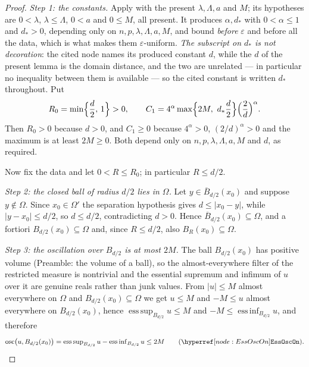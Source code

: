 \begin{proof}
\emph{Step 1: the constants.}  Apply 
with the present $\lambda,\Lambda,a$ and $M$; its hypotheses are $0<\lambda$,
$\lambda\le\Lambda$, $0<a$ and $0\le M$, all present.  It produces
$\alpha,d_\ast$ with $0<\alpha\le1$ and $d_\ast>0$, depending only on
$n,p,\lambda,\Lambda,a,M$, and bound \emph{before} $\varepsilon$ and before all
the data, which is what makes them $\varepsilon$-uniform.  \emph{The subscript
on $d_\ast$ is not decoration}: the cited node names its produced constant
$d$, while the $d$ of the present lemma is the domain distance, and the two are
unrelated --- in particular no inequality between them is available --- so the
cited constant is written $d_\ast$ throughout.  Put
\[
R_0=\min\Bigl\{\frac d2,\,1\Bigr\}>0,
\qquad
C_1=4^{\alpha}\max\Bigl\{2M,\ d_\ast\frac d2\Bigr\}\Bigl(\frac2d\Bigr)^{\alpha} .
\]
Then $R_0>0$ because $d>0$, and $C_1\ge0$ because $4^{\alpha}>0$,
$(2/d)^{\alpha}>0$ and the maximum is at least $2M\ge0$.  Both depend only on
$n,p,\lambda,\Lambda,a,M$ and $d$, as required.

Now fix the data and let $0<R\le R_0$; in particular $R\le d/2$.

\emph{Step 2: the closed ball of radius $d/2$ lies in $\Omega$.}  Let
$y\in\overline B_{d/2}(x_0)$ and suppose $y\notin\Omega$.  Since $x_0\in\Omega'$
the separation hypothesis gives $d\le|x_0-y|$, while $|y-x_0|\le d/2$, so
$d\le d/2$, contradicting $d>0$.  Hence $\overline B_{d/2}(x_0)\subseteq\Omega$,
and a fortiori $B_{d/2}(x_0)\subseteq\Omega$ and, since $R\le d/2$, also
$B_R(x_0)\subseteq\Omega$.

\emph{Step 3: the oscillation over $B_{d/2}$ is at most $2M$.}  The ball
$B_{d/2}(x_0)$ has positive volume (Preamble: the volume of a ball), so the
almost-everywhere filter of the restricted measure is nontrivial and the
essential supremum and infimum of $u$ over it are genuine reals rather than
junk values.  From $|u|\le M$ almost everywhere on $\Omega$ and
$B_{d/2}(x_0)\subseteq\Omega$ we get $u\le M$ and $-M\le u$ almost everywhere
on $B_{d/2}(x_0)$, hence
$\operatorname{ess\,sup}_{B_{d/2}}u\le M$ and
$-M\le\operatorname{ess\,inf}_{B_{d/2}}u$, and therefore
\[
\operatorname*{osc}\bigl(u,B_{d/2}(x_0)\bigr)
=\operatorname{ess\,sup}_{B_{d/2}}u-\operatorname{ess\,inf}_{B_{d/2}}u\le2M
\qquad(\noderef{EssOscOn}).
\]


\end{proof}
